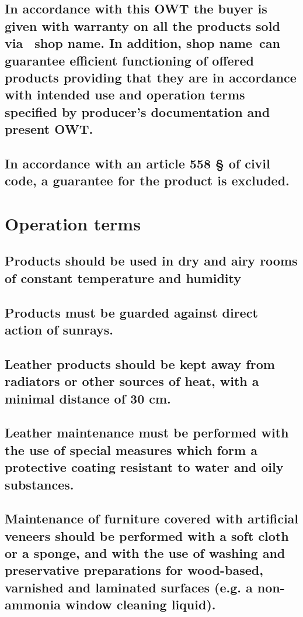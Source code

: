 \documentclass[10pt,a4paper]{article}
\begin{document}
\subsection{In accordance with this OWT the buyer is given with warranty on all the products sold via \ shop name. In addition, shop name\ can guarantee efficient functioning of offered products providing that they are in accordance with intended use and operation terms specified by producer’s documentation and present OWT.}

\subsection{In accordance with an article 558 § of civil code, a guarantee for the product is excluded.}

\section{Operation terms}

\subsection{Products should be used in dry and airy rooms of constant temperature and humidity}

\subsection{Products must be guarded against direct action of sunrays.}

\subsection{Leather products should be kept away from radiators or other sources of heat, with a minimal distance of 30 cm.}

\subsection{Leather maintenance must be performed with the use of special measures which form a protective coating resistant to water and oily substances.}

\subsection{Maintenance of furniture covered with artificial veneers should be performed with a soft cloth or a sponge, and with the use of washing and preservative preparations for wood-based, varnished and laminated surfaces (e.g. a non-ammonia window cleaning liquid).}
\end{document}
